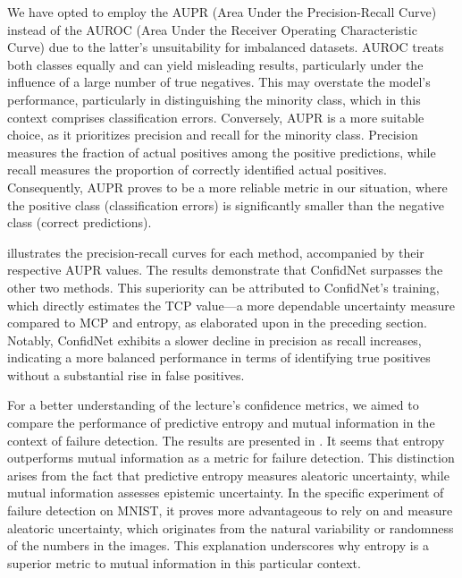 We have opted to employ the AUPR (Area Under the Precision-Recall Curve) instead of the AUROC (Area Under the Receiver Operating Characteristic Curve) due to the latter's unsuitability for imbalanced datasets. AUROC treats both classes equally and can yield misleading results, particularly under the influence of a large number of true negatives. This may overstate the model's performance, particularly in distinguishing the minority class, which in this context comprises classification errors. Conversely, AUPR is a more suitable choice, as it prioritizes precision and recall for the minority class. Precision measures the fraction of actual positives among the positive predictions, while recall measures the proportion of correctly identified actual positives. Consequently, AUPR proves to be a more reliable metric in our situation, where the positive class (classification errors) is significantly smaller than the negative class (correct predictions).

 illustrates the precision-recall curves for each method, accompanied by their respective AUPR values. The results demonstrate that ConfidNet surpasses the other two methods. This superiority can be attributed to ConfidNet's training, which directly estimates the TCP value—a more dependable uncertainty measure compared to MCP and entropy, as elaborated upon in the preceding section. Notably, ConfidNet exhibits a slower decline in precision as recall increases, indicating a more balanced performance in terms of identifying true positives without a substantial rise in false positives.

For a better understanding of the lecture's confidence metrics, we aimed to compare the performance of predictive entropy and mutual information in the context of failure detection. The results are presented in . It seems that entropy outperforms mutual information as a metric for failure detection. This distinction arises from the fact that predictive entropy measures aleatoric uncertainty, while mutual information assesses epistemic uncertainty. In the specific experiment of failure detection on MNIST, it proves more advantageous to rely on and measure aleatoric uncertainty, which originates from the natural variability or randomness of the numbers in the images. This explanation underscores why entropy is a superior metric to mutual information in this particular context.

